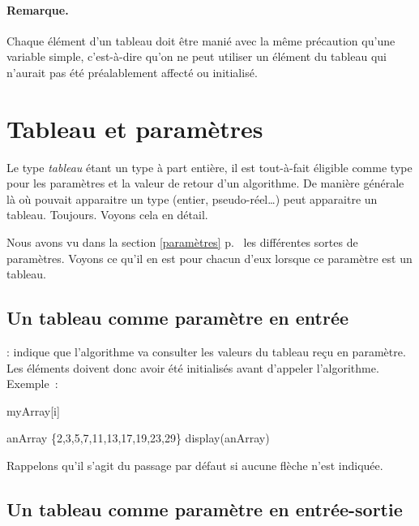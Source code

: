 	\paragraph{Remarque.} Chaque élément d’un tableau doit être manié avec la
	même précaution qu’une variable simple, c’est-à-dire qu’on ne peut utiliser
	un élément du tableau qui n’aurait pas été préalablement affecté ou
	initialisé.

		

	\section{Tableau et paramètres}
	
		Le type \emph{tableau} étant un type à part entière, il est tout-à-fait
		éligible comme type pour les paramètres et la valeur de retour d’un
		algorithme.  De manière générale là où pouvait apparaitre un type
		(entier, pseudo-réel…) peut apparaitre un tableau.  Toujours.  Voyons
		cela en détail.  

		Nous avons vu dans la section \ref{paramètres} p.~\pageref{paramètres}
		les différentes sortes de paramètres. Voyons ce qu'il en est pour
		chacun d'eux lorsque ce paramètre est un tableau. 


		\subsection{Un tableau comme paramètre en entrée}
				
		\In : indique que l’algorithme va consulter les valeurs du tableau reçu
		en paramètre.  Les éléments doivent donc avoir été initialisés avant
		d’appeler l’algorithme. Exemple~:
			
		\begin{pseudocode}
					\Write myArray[i]
				\EndFor
			\EndAlgo 

			\Empty
			\Let anArray \Gets \{2,3,5,7,11,13,17,19,23,29\}
			\Stmt display(anArray)
		\end{pseudocode}
	
		Rappelons qu’il s’agit du passage par défaut si aucune flèche n’est
		indiquée.
				

		\subsection{Un tableau comme paramètre en entrée-sortie}

